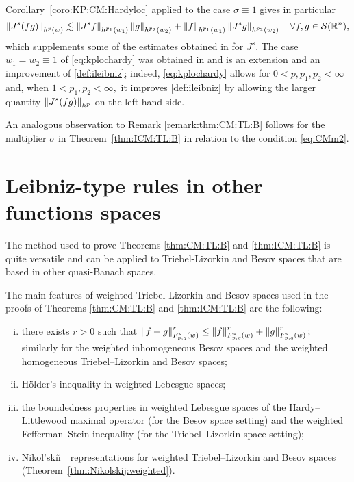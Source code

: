 Corollary~\ref{coro:KP:CM:Hardyloc} applied to the case $\sigma\equiv 1$ gives in particular 
\begin{equation}\label{eq:kplochardy}
\norm{J^s(fg)}{h^p(w)} \lesssim \norm{J^s f}{h^{p_1}(w_1)} \norm{g}{h^{p_2}(w_2)} +  \norm{f}{h^{p_1}(w_1)}   \norm{J^s g}{h^{p_2}(w_2)} \quad \forall f, g \in \sw,
\end{equation}
which  supplements  some of the estimates obtained in \cite[Theorem 1.1]{MR3513582} for $J^s$.  The case $w_1=w_2\equiv 1$ of \eqref{eq:kplochardy} was obtained in \cite{MR3750316} and is an extension and an improvement of \eqref{def:ileibniz}; indeed,  \eqref{eq:kplochardy} allows for $0<p,p_1,p_2<\infty$ and, when $1<p_1,p_2<\infty,$ it improves \eqref{def:ileibniz} by allowing the larger quantity $\norm{J^s(fg)}{h^p}$ on the left-hand side.

\begin{remark}
An analogous observation to Remark \ref{remark:thm:CM:TL:B} follows for the multiplier $\sigma$ in Theorem~\ref{thm:ICM:TL:B} in relation to the condition  \eqref{eq:CMm2}.
\end{remark}
 
 

 
 \section{Leibniz-type rules in other functions spaces}\label{sec:othersettings}
 The method used to prove Theorems \ref{thm:CM:TL:B} and \ref{thm:ICM:TL:B} is quite versatile and can be applied to Triebel-Lizorkin and Besov spaces that are based in other quasi-Banach spaces.
 
The main features of weighted Triebel-Lizorkin and Besov spaces used in the proofs of Theorems \ref{thm:CM:TL:B} and \ref{thm:ICM:TL:B} are the following:
\begin{enumerate}[(i)]
\item\label{item:first} there exists $r>0$ such that $\norm{f+g}{\itlw{p}{s}{q}{w}}^r\le \norm{f}{\itlw{p}{s}{q}{w}}^r+\norm{g}{\itlw{p}{s}{q}{w}}^r;$ similarly for the weighted inhomogeneous  Besov spaces and the weighted homogeneous  Triebel--Lizorkin and Besov spaces;
\item \label{item:second} H\"older's inequality in weighted Lebesgue spaces;
\item \label{item:third}  the boundedness properties in weighted Lebesgue spaces  of the Hardy--Littlewood maximal operator (for the Besov space setting) and the weighted Fefferman--Stein inequality (for the Triebel--Lizorkin space setting);
\item \label{item:last} Nikol'ski\u\i$\text{ }$  representations for weighted Triebel--Lizorkin and Besov spaces (Theorem~\ref{thm:Nikolskij:weighted}).
\end{enumerate}

